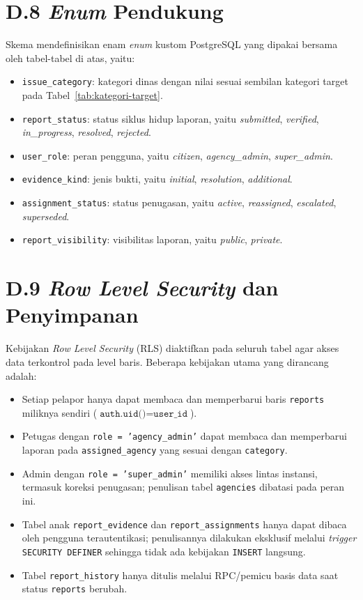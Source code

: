 \section*{D.8 \textit{Enum} Pendukung}

Skema mendefinisikan enam \textit{enum} kustom PostgreSQL yang dipakai bersama oleh tabel-tabel di atas, yaitu:

\begin{itemize}
    \item \texttt{issue\_category}: kategori dinas dengan nilai sesuai sembilan kategori target pada Tabel~\ref{tab:kategori-target}.
    \item \texttt{report\_status}: status siklus hidup laporan, yaitu \textit{submitted}, \textit{verified}, \textit{in\_progress}, \textit{resolved}, \textit{rejected}.
    \item \texttt{user\_role}: peran pengguna, yaitu \textit{citizen}, \textit{agency\_admin}, \textit{super\_admin}.
    \item \texttt{evidence\_kind}: jenis bukti, yaitu \textit{initial}, \textit{resolution}, \textit{additional}.
    \item \texttt{assignment\_status}: status penugasan, yaitu \textit{active}, \textit{reassigned}, \textit{escalated}, \textit{superseded}.
    \item \texttt{report\_visibility}: visibilitas laporan, yaitu \textit{public}, \textit{private}.
\end{itemize}

\section*{D.9 \textit{Row Level Security} dan Penyimpanan}

Kebijakan \textit{Row Level Security} (RLS) diaktifkan pada seluruh tabel agar akses data terkontrol pada level baris. Beberapa kebijakan utama yang dirancang adalah:

\begin{itemize}
    \item Setiap pelapor hanya dapat membaca dan memperbarui baris \texttt{reports} miliknya sendiri (\(\texttt{auth.uid()} = \texttt{user\_id}\)).
    \item Petugas dengan \texttt{role = 'agency\_admin'} dapat membaca dan memperbarui laporan pada \texttt{assigned\_agency} yang sesuai dengan \texttt{category}.
    \item Admin dengan \texttt{role = 'super\_admin'} memiliki akses lintas instansi, termasuk koreksi penugasan; penulisan tabel \texttt{agencies} dibatasi pada peran ini.
    \item Tabel anak \texttt{report\_evidence} dan \texttt{report\_assignments} hanya dapat dibaca oleh pengguna terautentikasi; penulisannya dilakukan eksklusif melalui \textit{trigger} \texttt{SECURITY DEFINER} sehingga tidak ada kebijakan \texttt{INSERT} langsung.
    \item Tabel \texttt{report\_history} hanya ditulis melalui RPC/pemicu basis data saat status \texttt{reports} berubah.
\end{itemize}

